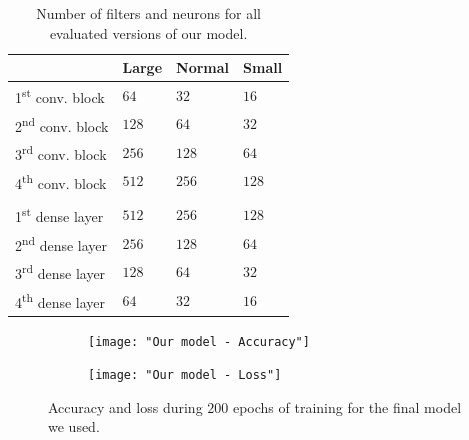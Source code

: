 \documentclass{article}
\begin{document}
\begin{table}
  \centering
  \begin{tabular}{ |p{2.2cm}||p{1.2cm}|p{1.2cm}|p{1.2cm}| }
    \hline
     & Large & Normal & Small\\
    \hline
    1\textsuperscript{st} conv. block & $64$ & $32$ & $16$\\
    \hline
    2\textsuperscript{nd} conv. block & $128$ & $64$ & $32$\\
    \hline
    3\textsuperscript{rd} conv. block & $256$ & $128$ & $64$\\
    \hline
    4\textsuperscript{th} conv. block & $512$ & $256$ & $128$\\
    \hline
     & & & \\
    \hline
    1\textsuperscript{st} dense layer & $512$ & $256$ & $128$\\
    \hline
    2\textsuperscript{nd} dense layer & $256$ & $128$ & $64$\\
    \hline
    3\textsuperscript{rd} dense layer & $128$ & $64$ & $32$\\
    \hline
    4\textsuperscript{th} dense layer & $64$ & $32$ & $16$\\
    \hline
  \end{tabular}
  \caption{Number of filters and neurons for all evaluated versions of our model.}
  \label{tab:model parameters}
\end{table}

\begin{figure}
  \begin{subfigure}{0.23\textwidth}
    \centering
    \texttt{[image: "Our model - Accuracy"]}
  \end{subfigure}
  \begin{subfigure}{0.23\textwidth}
    \centering
    \texttt{[image: "Our model - Loss"]}
  \end{subfigure}
  \caption{Accuracy and loss during $200$ epochs of training for the final model we used.}
  \label{fig:our model}
\end{figure}
\end{document}
